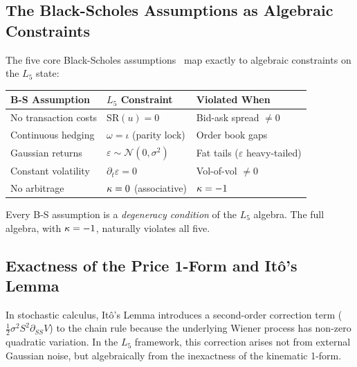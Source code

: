 \subsection{The Black-Scholes Assumptions as Algebraic Constraints}

The five core Black-Scholes assumptions~\cite{hull2018} map exactly to algebraic constraints on the $L_5$ state:

\begin{center}
\begin{tabular}{@{}lll@{}}
\toprule
\textbf{B-S Assumption} & \textbf{$L_5$ Constraint} & \textbf{Violated When} \\
\midrule
No transaction costs & $\mathrm{SR}(u) = 0$ & Bid-ask spread $\neq 0$ \\
Continuous hedging & $\omega = \iota$ (parity lock) & Order book gaps \\
Gaussian returns & $\varepsilon \sim \mathcal{N}(0, \sigma^2)$ & Fat tails ($\varepsilon$ heavy-tailed) \\
Constant volatility & $\partial_t \varepsilon = 0$ & Vol-of-vol $\neq 0$ \\
No arbitrage & $\kappa = 0$ (associative) & $\kappa = -1$ \\
\bottomrule
\end{tabular}
\end{center}

Every B-S assumption is a \emph{degeneracy condition} of the $L_5$ algebra. The full algebra, with $\kappa = -1$, naturally violates all five.

\subsection{Exactness of the Price 1-Form and It\^o's Lemma}

In stochastic calculus, It\^o's Lemma introduces a second-order correction term ($\frac{1}{2}\sigma^2 S^2 \partial_{SS} V$) to the chain rule because the underlying Wiener process has non-zero quadratic variation. In the $L_5$ framework, this correction arises not from external Gaussian noise, but algebraically from the inexactness of the kinematic 1-form.

